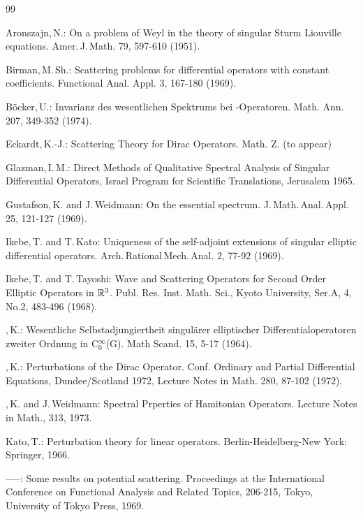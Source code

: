 \documentclass[11pt,twoside]{article}
\begin{document}
\vspace{8mm}
\begin{thebibliography}{99}
\begin{small}

  Aronszajn,\,N.:
On a problem of Weyl in the theory of singular Sturm Liouville equations.
Amer.\,J.\,Math. 79, 597-610 (1951).

  Birman,\,M.\,Sh.:
Scattering problems for differential operators with constant coefficients.
Functional Anal. Appl. 3, 167-180 (1969).

  B{\"o}cker,\,U.:
Invarianz des wesentlichen Spektrums bei {\SCHROEDINGER}-Operatoren.
Math. Ann. 207, 349-352 (1974).

  Eckardt,\,K.-J.:
Scattering Theory for Dirac Operators.
Math. Z. (to appear)

  Glazman,\,I.\,M.:
Direct Methods of Qualitative Spectral Analysis
of Singular Differential Operators,
Israel Program for Scientific Translations, Jerusalem 1965.

  Gustafson,\,K. and J.\,Weidmann:
On the essential spectrum.
J.\,Math.\,Anal.\,Appl. 25, 121-127 (1969).

  Ikebe,\,T. and T.\,Kato:
Uniqueness of the self-adjoint extensions
of singular elliptic differential operators.
Arch.\,Rational\,Mech.\,Anal. 2, 77-92 (1969).

  Ikebe,\,T. and T.\,Tayoshi:
Wave and Scattering Operators for Second Order Elliptic Operators in ${\mathbb{R}}^3$.
Publ. Res. Inst. Math. Sci.,
Kyoto University, Ser.A, 4, No.2, 483-496 (1968).

  {\JOERGENS},\,K.:
Wesentliche Selbstadjungiertheit singul{\"a}rer elliptischer
Differentialoperatoren zweiter Ordnung in C$_0^{\infty}$(G).
Math Scand. 15, 5-17 (1964).

 {\JOERGENS},\,K.:
Perturbations of the Dirac Operator.
Conf. Ordinary and Partial Differential Equations, Dundee/Scotland 1972,
Lecture Notes in Math. 280, 87-102 (1972).

 {\JOERGENS},\,K. and J.\,Weidmann:
Spectral Prperties of Hamitonian Operators.
Lecture Notes in Math., 313, 1973.

  Kato,\,T.:
Perturbation theory for linear operators.
Berlin-Heidelberg-New York:
Springer, 1966.

  -----:
Some results on potential scattering.
Proceedings at the International Conference on Functional Analysis
and Related Topics,
206-215, Tokyo, University of Tokyo Press, 1969.


\end{small}
\end{thebibliography}
\end{document}
